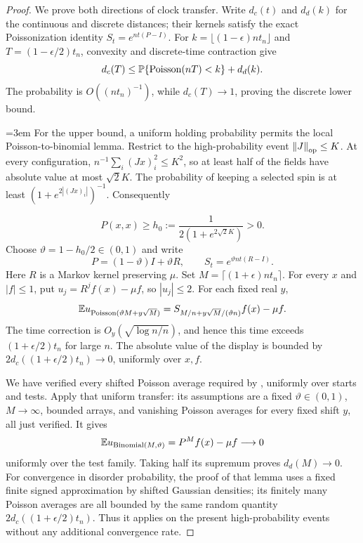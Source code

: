 \begin{proof}
We prove both directions of clock transfer.  Write $d_c(t)$ and
$d_d(k)$ for the continuous and discrete distances; their kernels satisfy
the exact Poissonization identity $S_t=e^{nt(P-I)}$.  For
$k=\lfloor(1-\epsilon)nt_n\rfloor$ and
$T=(1-\epsilon/2)t_n$, convexity and discrete-time contraction give
\[
 d_c(T)\le\P\{\operatorname{Poisson}(nT)<k\}+d_d(k).
\]
The probability is $O((nt_n)^{-1})$, while
$d_c(T)\to1$, proving the discrete lower bound.

{\emergencystretch=3em
For the upper bound, a uniform holding probability permits the local
Poisson-to-binomial lemma.  Restrict to the high-probability event
$\norm J_\op\le K$.  At every configuration,
$n^{-1}\sum_i(Jx)_i^2\le K^2$, so at least half of the fields have
absolute value at most $\sqrt2K$.  The probability of keeping a
selected spin is at least $(1+e^{2|(Jx)_i|})^{-1}$.  Consequently\par}
\begin{equation}
 P(x,x)\ge h_0:=\frac1{2(1+e^{2\sqrt2K})}>0.
 \label{eq:cutoff-holding}
\end{equation}
Choose $\vartheta=1-h_0/2\in(0,1)$ and write
\[
 P=(1-\vartheta)I+\vartheta R,
 \qquad S_t=e^{\vartheta nt(R-I)}.
\]
Here $R$ is a Markov kernel preserving $\mu$.
Set $M=\lceil(1+\epsilon)nt_n\rceil$.  For every $x$ and $|f|\le1$,
put $u_j=R^jf(x)-\mu f$, so $|u_j|\le2$.  For each fixed real $y$,
\[
 \E u_{\operatorname{Poisson}(\vartheta M+y\sqrt M)}
 =S_{M/n+y\sqrt M/(\vartheta n)}f(x)-\mu f.
\]
The time correction is $O_y(\sqrt{\log n/n})$, and hence this
time exceeds $(1+\epsilon/2)t_n$ for large $n$.  The absolute value
of the display is bounded by
$2d_c((1+\epsilon/2)t_n)\to0$, uniformly over $x,f$.

We have verified every shifted Poisson average required by
, uniformly over starts and tests.  Apply that
uniform transfer: its assumptions are a fixed
$\vartheta\in(0,1)$, $M\to\infty$, bounded arrays, and vanishing
Poisson averages for every fixed shift $y$, all just verified.
It gives
\[
 \E u_{\operatorname{Binomial}(M,\vartheta)}
       =P^Mf(x)-\mu f\longrightarrow0
\]
uniformly over the test family.  Taking half its supremum proves
$d_d(M)\to0$.  For convergence in disorder probability, the proof of
that lemma uses a fixed finite signed approximation by shifted
Gaussian densities; its finitely many Poisson averages are all
bounded by the same random quantity $2d_c((1+\epsilon/2)t_n)$.
Thus it applies on the present high-probability events without any
additional convergence rate.
\end{proof}
